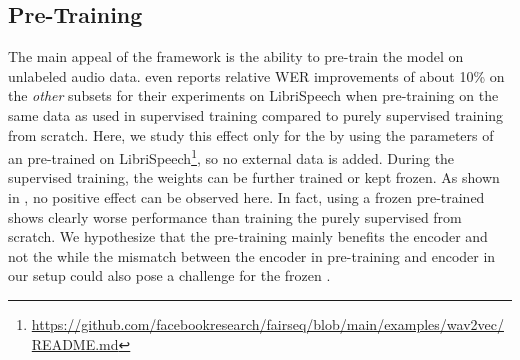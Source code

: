 \documentclass{INTERSPEECH2023}
\begin{document}
%

%

\subsection{\wvtwo Pre-Training}
The main appeal of the \wvtwo framework is the ability to pre-train the model on unlabeled audio data.
\cite{facebook2020wav2vec2} even reports relative \gls{WER} improvements of about 10\% on the \textit{other} subsets for their experiments on LibriSpeech when pre-training on the same data as used in supervised training compared to purely supervised training from scratch.
Here, we study this effect only for the \fe by using the parameters of an \fe pre-trained on LibriSpeech\footnote{\raggedright\url{https://github.com/facebookresearch/fairseq/blob/main/examples/wav2vec/README.md}}, so no external data is added.
During the supervised training, the \fe weights can be further trained or kept frozen.
As shown in , no positive effect can be observed here.
In fact, using a frozen pre-trained \fe shows clearly worse performance than training the \fe purely supervised from scratch.
We hypothesize that the pre-training mainly benefits the \transformer encoder and not the \fe while the mismatch between the \transformer encoder in pre-training and \conformer encoder in our setup could also pose a challenge for the frozen \fe.

\end{document}
